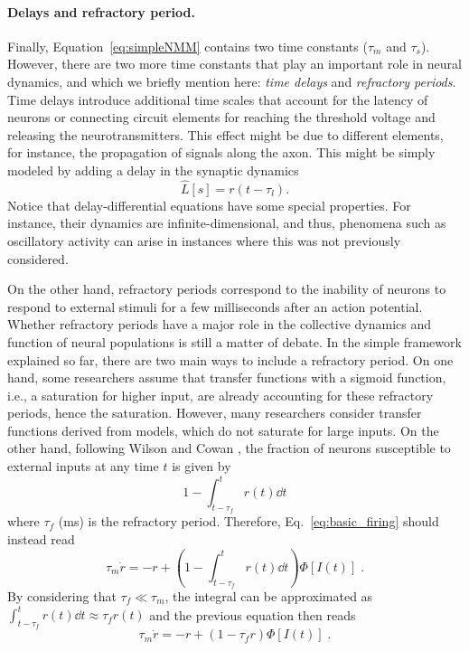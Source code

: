 \documentclass[11pt]{article}
\numberwithin{equation}{section}
\begin{document}
\paragraph{Delays and refractory period.} Finally, Equation~\eqref{eq:simpleNMM} contains two time constants ($\tau_m$ and $\tau_s$).
However, there are two more time constants that play an important role in neural dynamics, and which we briefly mention here: 
 \textit{time delays} and \textit{refractory periods}.
Time delays introduce additional time scales that account for the latency of neurons or connecting circuit elements
for reaching the threshold voltage and releasing the neurotransmitters.
This effect might be due to different elements, for instance, the propagation of signals along the axon.
This might be simply modeled by adding a delay in the synaptic dynamics
\begin{equation}
\hat L[s]  =  r(t-\tau_l).
 \end{equation}
Notice that delay-differential equations have some special properties.
For instance, their dynamics are infinite-dimensional, and thus, phenomena such as
oscillatory activity can arise in instances where this was not previously considered.

On the other hand, refractory periods correspond to the inability of neurons to respond
to external stimuli for a few milliseconds after an action potential.
Whether refractory periods have a major role in the collective dynamics and function of neural populations is still a matter of debate.
In the simple framework explained so far, there are two main ways to include a refractory period.
On one hand, some researchers assume that transfer functions with a sigmoid function, i.e., a saturation for higher input, are already accounting for these refractory periods, hence the saturation.
However, many researchers consider transfer functions derived from models, which do not saturate for large inputs.
On the other hand, following Wilson and Cowan \cite{wilson_excitatory_1972}, the fraction of neurons susceptible to external inputs
at any time $t$ is given by
\begin{equation}
    1-\int_{t-\tau_f}^t r(t) \dd t
\end{equation}
where $\tau_f$ (ms) is the refractory period.
Therefore, Eq.~\eqref{eq:basic_firing} should instead read
\begin{equation}
    \tau_m \dot r = -r + \left(1-\int_{t-\tau_{f}}^t r(t) \dd t\right)\Phi[ I(t) ]\;.
\end{equation}
By considering that $\tau_{f}\ll \tau_m$, the integral can be approximated 
as $\int_{t-\tau_{f}}^t r(t) \dd t\approx \tau_{f} r(t)$ and the previous equation then reads
\begin{equation}
    \tau_m \dot r = -r + \left(1-\tau_{f}r\right)\Phi[ I(t) ]\;.
\end{equation}
\end{document}
